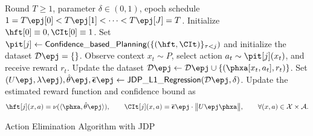 
\begin{algorithm}
\begin{algorithmic}
\REQUIRE Round $T\geq 1$, parameter $\delta\in(0,1)$, epoch schedule $1=T\epj[0]<T\epj[1]<\cdots<T\epj[J]=T$.
\STATE Initialize $\hft[0]\equiv 0, \CIt[0]\equiv 1$.
\STATE Set $\pit[j]\leftarrow\AlgPlan(\set{ (\hft,\CIt)  }_{\tau<j})$ and initialize the dataset $\dataset\epj=\sset{}$.
\STATE Observe context $x_t\sim P$, select action $a_t\sim \pit[j](x_t)$, and receive reward $r_t$. 
\STATE Update the dataset $\dataset\epj \leftarrow \dataset\epj \cup \sset{ (\phxa[x_t,a_t], r_t) }$.
\ENDFOR
\STATE Set $(U\epj, \lambda\epj), \hth\epj,\lamall\epj \leftarrow \AlgJDPRegression(\cD\epj,\delta)$.
\STATE Update the estimated reward function and confidence bound as
\begin{align*}
    \hft[j](x,a)=\nu(\lr \phxa, \hth\epj \rr), \qquad
    \CIt[j](x,a)=\lamall \epj \cdot \nrmn{U\epj \phxa}, \qquad \forall (x,a)\in\cX\times\cA.
\end{align*}
\ENDFOR
\end{algorithmic}
\caption{Action Elimination Algorithm with JDP}\label{alg:batch-cb-JDP}
\end{algorithm}
